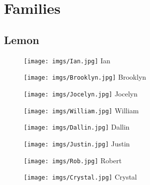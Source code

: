\documentclass[english]{article}
\begin{document}
\section*{Families}
\label{sec:Families}

\subsection*{Lemon}

\begin{figure}[H]
    \begin{minipage}[b]{0.2\linewidth}
        \centering
        \texttt{[image: imgs/Ian.jpg]}
        Ian
    \end{minipage}
    \hspace{0.5cm}
    \begin{minipage}[b]{0.2\linewidth}
        \centering
        \texttt{[image: imgs/Brooklyn.jpg]}
        Brooklyn
    \end{minipage}
    \hspace{0.5cm}
    \begin{minipage}[b]{0.2\linewidth}
        \centering
        \texttt{[image: imgs/Jocelyn.jpg]}
        Jocelyn
    \end{minipage}
    \hspace{0.5cm}
    \begin{minipage}[b]{0.2\linewidth}
        \centering
        \texttt{[image: imgs/William.jpg]}
        William
    \end{minipage}
\end{figure}
\begin{figure}[H]
    \begin{minipage}[b]{0.2\linewidth}
        \centering
        \texttt{[image: imgs/Dallin.jpg]}
        Dallin
    \end{minipage}
    \hspace{0.5cm}
    \begin{minipage}[b]{0.2\linewidth}
        \centering
        \texttt{[image: imgs/Justin.jpg]}
        Justin
    \end{minipage}
    \hspace{0.5cm}
    \begin{minipage}[b]{0.2\linewidth}
        \centering
        \texttt{[image: imgs/Rob.jpg]}
        Robert
    \end{minipage}
    \hspace{0.5cm}
    \begin{minipage}[b]{0.2\linewidth}
        \centering
        \texttt{[image: imgs/Crystal.jpg]}
        Crystal
    \end{minipage}
\end{figure}
\end{document}
